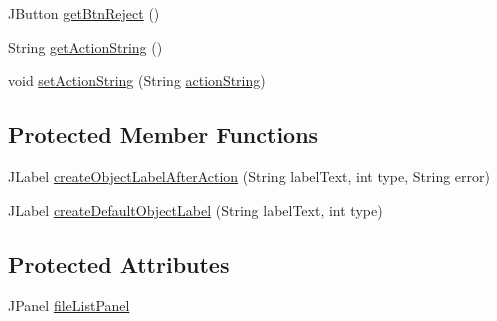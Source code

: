 \begin{DoxyCompactItemize}
\item 
J\-Button \hyperlink{classcom_1_1poly_1_1nlp_1_1filekommander_1_1views_1_1panels_1_1_abstract_file_folder_panel_af76ef5d7d4e3c50bb2f2b3050d7863ee}{get\-Btn\-Reject} ()
\item 
String \hyperlink{classcom_1_1poly_1_1nlp_1_1filekommander_1_1views_1_1panels_1_1_abstract_file_folder_panel_aff16d223c2bdcd122ef6f74d1827f05f}{get\-Action\-String} ()
\item 
void \hyperlink{classcom_1_1poly_1_1nlp_1_1filekommander_1_1views_1_1panels_1_1_abstract_file_folder_panel_a25ffb42f58f97066dce7fe2d7597817e}{set\-Action\-String} (String \hyperlink{classcom_1_1poly_1_1nlp_1_1filekommander_1_1views_1_1panels_1_1_abstract_file_folder_panel_a4aa17cf3129edfcd0246d4486f646987}{action\-String})
\end{DoxyCompactItemize}
\subsection*{Protected Member Functions}
\begin{DoxyCompactItemize}
\item 
J\-Label \hyperlink{classcom_1_1poly_1_1nlp_1_1filekommander_1_1views_1_1panels_1_1_abstract_file_folder_panel_a4f5fea4f0c8b3aaf4e1387bed4886446}{create\-Object\-Label\-After\-Action} (String label\-Text, int type, String error)
\item 
J\-Label \hyperlink{classcom_1_1poly_1_1nlp_1_1filekommander_1_1views_1_1panels_1_1_abstract_file_folder_panel_a20975a6589130de0b99c932b695f7ce5}{create\-Default\-Object\-Label} (String label\-Text, int type)
\end{DoxyCompactItemize}
\subsection*{Protected Attributes}
\begin{DoxyCompactItemize}
\item 
J\-Panel \hyperlink{classcom_1_1poly_1_1nlp_1_1filekommander_1_1views_1_1panels_1_1_abstract_file_folder_panel_a689e61b3368ccffe664ce92aad547fb5}{file\-List\-Panel}
\end{DoxyCompactItemize}
